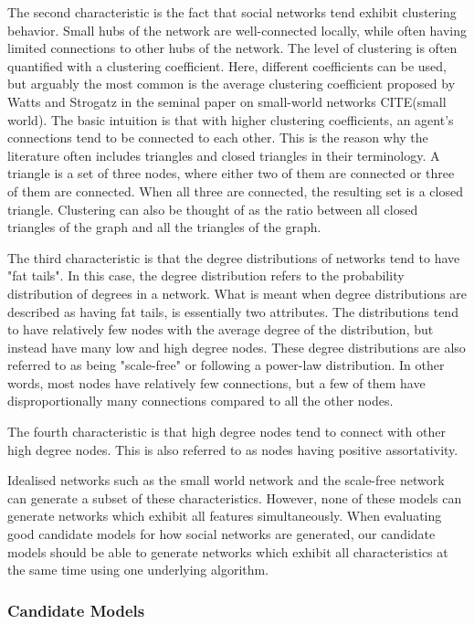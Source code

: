\documentclass[9pt,twocolumn,twoside]{ilcss}
\begin{document}
The second characteristic is the fact that social networks tend exhibit clustering behavior. Small hubs of the network are well-connected locally, while often having limited connections to other hubs of the network. 
The level of clustering is often quantified with a clustering coefficient. Here, different coefficients can be used, but arguably the most common is the average clustering coefficient proposed by Watts and Strogatz in the seminal paper on small-world networks CITE(small world).
The basic intuition is that with higher clustering coefficients, an agent's connections tend to be connected to each other. 
This is the reason why the literature often includes triangles and closed triangles in their terminology. 
A triangle is a set of three nodes, where either two of them are connected or three of them are connected. When all three are connected, the resulting set is a closed triangle. 
Clustering can also be thought of as the ratio between all closed triangles of the graph and all the triangles of the graph. 

The third characteristic is that the degree distributions of networks tend to have "fat tails".
In this case, the degree distribution refers to the probability distribution of degrees in a network. 
What is meant when degree distributions are described as having fat tails, is essentially two attributes. 
The distributions tend to have relatively few nodes with the average degree of the distribution, but instead have many low and high degree nodes.
These degree distributions are also referred to as being "scale-free" or following a power-law distribution. In other words, most nodes have relatively few connections, but a few of them have disproportionally many connections compared to all the other nodes. 

The fourth characteristic is that high degree nodes tend to connect with other high degree nodes. 
This is also referred to as nodes having positive assortativity. 

Idealised networks such as the small world network and the scale-free network can generate a subset of these characteristics.
However, none of these models can generate networks which exhibit all features simultaneously. 
When evaluating good candidate models for how social networks are generated, our candidate models
should be able to generate networks which exhibit all characteristics at the same time using one underlying algorithm. 

\subsubsection{Candidate Models}
\end{document}
